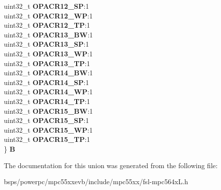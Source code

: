 \begin{DoxyCompactItemize}
\begin{tabbing}
\>uint32\_t {\bfseries OPACR12\_SP}:1\\
\>uint32\_t {\bfseries OPACR12\_WP}:1\\
\>uint32\_t {\bfseries OPACR12\_TP}:1\\
\>uint32\_t {\bfseries OPACR13\_BW}:1\\
\>uint32\_t {\bfseries OPACR13\_SP}:1\\
\>uint32\_t {\bfseries OPACR13\_WP}:1\\
\>uint32\_t {\bfseries OPACR13\_TP}:1\\
\>uint32\_t {\bfseries OPACR14\_BW}:1\\
\>uint32\_t {\bfseries OPACR14\_SP}:1\\
\>uint32\_t {\bfseries OPACR14\_WP}:1\\
\>uint32\_t {\bfseries OPACR14\_TP}:1\\
\>uint32\_t {\bfseries OPACR15\_BW}:1\\
\>uint32\_t {\bfseries OPACR15\_SP}:1\\
\>uint32\_t {\bfseries OPACR15\_WP}:1\\
\>uint32\_t {\bfseries OPACR15\_TP}:1\\
\} {\bfseries B}\\

\end{tabbing}\end{DoxyCompactItemize}


The documentation for this union was generated from the following file\+:\begin{DoxyCompactItemize}
\item 
bsps/powerpc/mpc55xxevb/include/mpc55xx/fsl-\/mpc564x\+L.\+h\end{DoxyCompactItemize}
